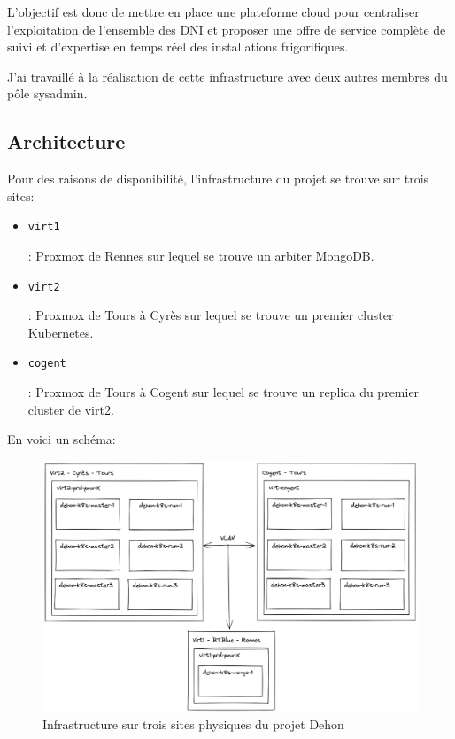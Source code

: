 \documentclass[12pt, a4paper, twoside]{article}
\begin{document}
L'objectif est donc de mettre en place une plateforme cloud pour centraliser l'exploitation de l'ensemble des \gls{DNI} et proposer une offre de service complète de suivi et d'expertise en temps réel des installations frigorifiques.

J'ai travaillé à la réalisation de cette infrastructure avec deux autres membres du pôle sysadmin.

\subsection{Architecture}
Pour des raisons de disponibilité, l'infrastructure du projet se trouve sur trois sites:
\begin{itemize}
    \item \begin{code}\texttt{virt1}\end{code}: \gls{Proxmox} de Rennes sur lequel se trouve un arbiter MongoDB. 
    \item \begin{code}\texttt{virt2}\end{code}: \gls{Proxmox} de Tours à Cyrès sur lequel se trouve un premier \gls{cluster} \gls{Kubernetes}.
    \item \begin{code}\texttt{cogent}\end{code}: \gls{Proxmox} de Tours à Cogent sur lequel se trouve un replica du premier \gls{cluster} de virt2.
\end{itemize}

\newpage
En voici un schéma:
\begin{figure}[!ht]
    \centering
        \includegraphics[width=\textwidth]{src/graph_dehon1.png}
    \caption{Infrastructure sur trois sites physiques du projet Dehon}
    \label{fig:graph_dehon1}
\end{figure}
\end{document}
